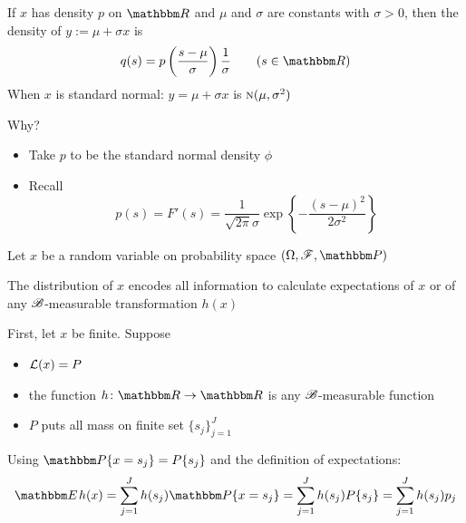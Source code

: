 \begin{frame}

    \vspace{2em}
    \Eg
    If $x$ has density $p$ on $\RR$ and $\mu$ and $\sigma$ are constants with 
    $\sigma > 0$, then the density of $y := \mu + \sigma x$ is
    \begin{equation*}
        q(s) = p \left( \frac{s - \mu}{\sigma} \right) 
                 \frac{1}{\sigma} 
                 \qquad (s \in \RR)
    \end{equation*}
    When $x$ is standard normal: $y = \mu
    + \sigma x$ is $\textrm{\sc n}(\mu, \sigma^2)$
    
    Why?
    \begin{itemize}
        \item Take $p$ to be the standard normal density $\phi$
        \item Recall%
            \begin{equation*}
                p(s) = F'(s) = 
                \frac{1}{\sqrt{2 \pi} \sigma}
                   \exp \left\{ - 
                       \frac{(s - \mu)^2}{2\sigma^2} \right\} 
            \end{equation*}
    \end{itemize}
    
\end{frame}

\begin{frame}

    \vspace{2em}
   Let $x$ be a random variable on probability space $(\Omega, \fF, \PP)$
   
   The distribution of $x$ encodes all information to calculate 
   expectations of $x$ or of any $\mathscr B$-measurable transformation $h(x)$
   
   First, let $x$ be finite. Suppose 
   
   \begin{itemize}
       \item  $\mathcal L(x) = P$
       \item  the function $h\colon \RR \to \RR$ is any $\mathscr B$-measurable function
       \item $P$ puts all mass on finite set $\{s_j\}_{j=1}^J$
   \end{itemize}
   
   \vspace{.7em}
   Using $\PP\{x = s_j\} = P\{s_j\}$ and the definition of expectations:
    \begin{equation*}
        \label{eq:ehx}
        \EE h(x) 
        = \sum_{j=1}^J h(s_j) \PP\{x = s_j\}
        = \sum_{j=1}^J h(s_j) P\{s_j\}
        = \sum_{j=1}^J h(s_j) p_j
    \end{equation*}

\end{frame}

